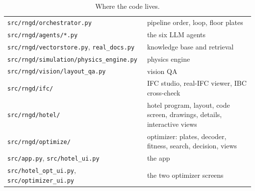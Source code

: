 \documentclass[10pt,a4paper]{article}
\newcommand{\code}[1]{\texttt{\small #1}}
\theoremstyle{definition}
\begin{document}
\begin{table}[H]
\centering\small
\caption{Where the code lives.}
\begin{tabular}{@{}l l@{}}
\toprule
\code{src/rngd/orchestrator.py} & pipeline order, loop, floor plates \\
\code{src/rngd/agents/*.py} & the six LLM agents \\
\code{src/rngd/vectorstore.py}, \code{real\_docs.py} & knowledge base and retrieval \\
\code{src/rngd/simulation/physics\_engine.py} & physics engine \\
\code{src/rngd/vision/layout\_qa.py} & vision QA \\
\code{src/rngd/ifc/} & IFC studio, real-IFC viewer, IBC cross-check \\
\code{src/rngd/hotel/} & hotel program, layout, code screen, drawings, details, interactive views \\
\code{src/rngd/optimize/} & optimizer: plates, decoder, fitness, search, decision, views \\
\code{src/app.py}, \code{src/hotel\_ui.py} & the app \\
\code{src/hotel\_opt\_ui.py}, \code{src/optimizer\_ui.py} & the two optimizer screens \\
\bottomrule
\end{tabular}
\end{table}
\end{document}
